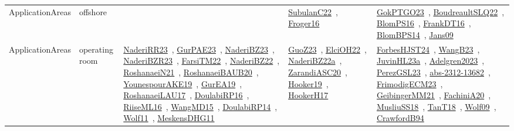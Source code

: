 {\begin{longtable}{lp{3cm}>{\raggedright\arraybackslash}p{6cm}>{\raggedright\arraybackslash}p{6cm}>{\raggedright\arraybackslash}p{8cm}}
\index{offshore}\index{ApplicationAreas!offshore}ApplicationAreas & offshore &  & \href{../works/SubulanC22.pdf}{SubulanC22}~\cite{SubulanC22}, \href{../works/Froger16.pdf}{Froger16}~\cite{Froger16} & \href{../works/GokPTGO23.pdf}{GokPTGO23}~\cite{GokPTGO23}, \href{../works/BoudreaultSLQ22.pdf}{BoudreaultSLQ22}~\cite{BoudreaultSLQ22}, \href{../works/BlomPS16.pdf}{BlomPS16}~\cite{BlomPS16}, \href{../works/FrankDT16.pdf}{FrankDT16}~\cite{FrankDT16}, \href{../works/BlomBPS14.pdf}{BlomBPS14}~\cite{BlomBPS14}, \href{../works/Jans09.pdf}{Jans09}~\cite{Jans09}\\
\index{operating room}\index{ApplicationAreas!operating room}ApplicationAreas & operating room & \href{../works/NaderiRR23.pdf}{NaderiRR23}~\cite{NaderiRR23}, \href{../works/GurPAE23.pdf}{GurPAE23}~\cite{GurPAE23}, \href{../works/NaderiBZ23.pdf}{NaderiBZ23}~\cite{NaderiBZ23}, \href{../works/NaderiBZR23.pdf}{NaderiBZR23}~\cite{NaderiBZR23}, \href{../works/FarsiTM22.pdf}{FarsiTM22}~\cite{FarsiTM22}, \href{../works/NaderiBZ22.pdf}{NaderiBZ22}~\cite{NaderiBZ22}, \href{../works/RoshanaeiN21.pdf}{RoshanaeiN21}~\cite{RoshanaeiN21}, \href{../works/RoshanaeiBAUB20.pdf}{RoshanaeiBAUB20}~\cite{RoshanaeiBAUB20}, \href{../works/YounespourAKE19.pdf}{YounespourAKE19}~\cite{YounespourAKE19}, \href{../works/GurEA19.pdf}{GurEA19}~\cite{GurEA19}, \href{../works/RoshanaeiLAU17.pdf}{RoshanaeiLAU17}~\cite{RoshanaeiLAU17}, \href{../works/DoulabiRP16.pdf}{DoulabiRP16}~\cite{DoulabiRP16}, \href{../works/RiiseML16.pdf}{RiiseML16}~\cite{RiiseML16}, \href{../works/WangMD15.pdf}{WangMD15}~\cite{WangMD15}, \href{../works/DoulabiRP14.pdf}{DoulabiRP14}~\cite{DoulabiRP14}, \href{../works/Wolf11.pdf}{Wolf11}~\cite{Wolf11}, \href{../works/MeskensDHG11.pdf}{MeskensDHG11}~\cite{MeskensDHG11} & \href{../works/GuoZ23.pdf}{GuoZ23}~\cite{GuoZ23}, \href{../works/ElciOH22.pdf}{ElciOH22}~\cite{ElciOH22}, \href{../works/NaderiBZ22a.pdf}{NaderiBZ22a}~\cite{NaderiBZ22a}, \href{../works/ZarandiASC20.pdf}{ZarandiASC20}~\cite{ZarandiASC20}, \href{../works/Hooker19.pdf}{Hooker19}~\cite{Hooker19}, \href{../works/HookerH17.pdf}{HookerH17}~\cite{HookerH17} & \href{../works/ForbesHJST24.pdf}{ForbesHJST24}~\cite{ForbesHJST24}, \href{../works/WangB23.pdf}{WangB23}~\cite{WangB23}, \href{../works/JuvinHL23a.pdf}{JuvinHL23a}~\cite{JuvinHL23a}, \href{../works/Adelgren2023.pdf}{Adelgren2023}~\cite{Adelgren2023}, \href{../works/PerezGSL23.pdf}{PerezGSL23}~\cite{PerezGSL23}, \href{../works/abs-2312-13682.pdf}{abs-2312-13682}~\cite{abs-2312-13682}, \href{../works/FrimodigECM23.pdf}{FrimodigECM23}~\cite{FrimodigECM23}, \href{../works/GeibingerMM21.pdf}{GeibingerMM21}~\cite{GeibingerMM21}, \href{../works/FachiniA20.pdf}{FachiniA20}~\cite{FachiniA20}, \href{../works/MusliuSS18.pdf}{MusliuSS18}~\cite{MusliuSS18}, \href{../works/TanT18.pdf}{TanT18}~\cite{TanT18}, \href{../works/Wolf09.pdf}{Wolf09}~\cite{Wolf09}, \href{../works/CrawfordB94.pdf}{CrawfordB94}~\cite{CrawfordB94}\\

\end{longtable}}
